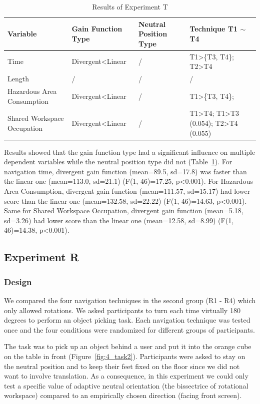 \begin{table}[!t]
\renewcommand{\arraystretch}{1.3}
\caption{Results of Experiment T}
\label{tab:4_result_t1}
\centering
\begin{tabular}{l l l l}
  \hline
  Variable & Gain Function Type & Neutral Position Type & Technique T1 $\sim$ T4 \\
  \hline
  Time & Divergent\textless Linear & / & T1\textgreater \{T3, T4\}; T2\textgreater T4 \\
  Length & / & / & / \\
  Hazardous Area Consumption & Divergent\textless Linear & / & T1\textgreater \{T3, T4\}; \\
  Shared Workspace Occupation & Divergent\textless Linear & / & T1\textgreater T4; T1\textgreater T3 (0.054); T2\textgreater T4 (0.055) \\
  \hline
\end{tabular}
\end{table}

Results showed that the gain function type had a significant influence on multiple dependent variables while the neutral position type did not (Table~\ref{tab:4_result_t1}). For navigation time, divergent gain function (mean=89.5, sd=17.8) was faster than the linear one (mean=113.0, sd=21.1) (F(1, 46)=17.25, p\textless 0.001). For Hazardous Area Consumption, divergent gain function (mean=111.57, sd=15.17) had lower score than the linear one (mean=132.58, sd=22.22) (F(1, 46)=14.63, p\textless 0.001). Same for Shared Workspace Occupation, divergent gain function (mean=5.18, sd=3.26) had lower score than the linear one (mean=12.58, sd=8.99) (F(1, 46)=14.38, p\textless 0.001).


\subsection{Experiment R}
\subsubsection{Design}
We compared the four navigation techniques in the second group (R1 - R4) which only allowed rotations. We asked participants to turn each time virtually 180 degrees to perform an object picking task. Each navigation technique was tested once and the four conditions were randomized for different groups of participants.

The task was to pick up an object behind a user and put it into the orange cube on the table in front (Figure~\ref{fig:4_task2}). Participants were asked to stay on the neutral position and to keep their feet fixed on the floor since we did not want to involve translation. As a consequence, in this experiment we could only test a specific value of adaptive neutral orientation (the bissectrice of rotational workspace) compared to an empirically chosen direction (facing front screen).

